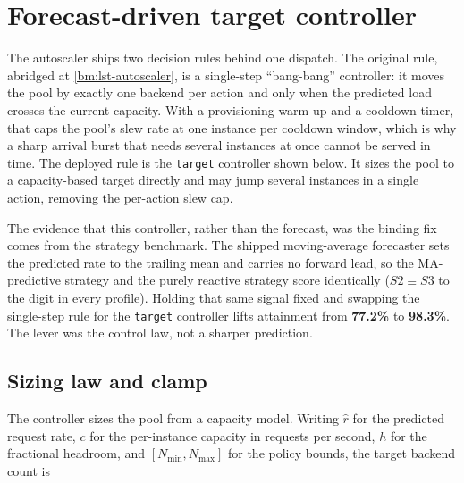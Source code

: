
\section{Forecast-driven target controller}\label{bm:alg:autoscaler}

The autoscaler ships two decision rules behind one dispatch. The original rule,
abridged at \cref{bm:lst-autoscaler}, is a single-step ``bang-bang'' controller:
it moves the pool by exactly one backend per action and only when the predicted
load crosses the current capacity. With a provisioning warm-up and a cooldown
timer, that caps the pool's slew rate at one instance per cooldown window, which
is why a sharp arrival burst that needs several instances at once cannot be
served in time. The deployed rule is the \texttt{target} controller shown below.
It sizes the pool to a capacity-based target directly and may jump several
instances in a single action, removing the per-action slew cap.

The evidence that this controller, rather than the forecast, was the binding fix
comes from the strategy benchmark. The shipped moving-average forecaster sets the
predicted rate to the trailing mean and carries no forward lead, so the
MA-predictive strategy and the purely reactive strategy score identically
($S2 \equiv S3$ to the digit in every profile). Holding that same signal fixed
and swapping the single-step rule for the \texttt{target} controller lifts
attainment from \textbf{77.2\%} to \textbf{98.3\%}. The lever was the control
law, not a sharper prediction.

\subsection*{Sizing law and clamp}

The controller sizes the pool from a capacity model. Writing $\hat{r}$ for the
predicted request rate, $c$ for the per-instance capacity in requests per second,
$h$ for the fractional headroom, and $[N_{\min}, N_{\max}]$ for the policy
bounds, the target backend count is

